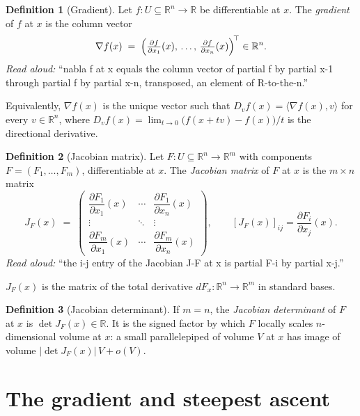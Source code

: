 \documentclass[11pt]{article}
\theoremstyle{definition}
\newtheorem{definition}{Definition}
\begin{document}
\begin{definition}[Gradient]
Let $f : U \subseteq \mathbb{R}^n \to \mathbb{R}$ be differentiable at $x$.
The \emph{gradient} of $f$ at $x$ is the column vector
\[
\nabla f(x) \;=\; \Bigl( \tfrac{\partial f}{\partial x_1}(x),\, \ldots,\,
\tfrac{\partial f}{\partial x_n}(x) \Bigr)^{\!\top} \in \mathbb{R}^n.
\]
\emph{Read aloud:} ``nabla f at x equals the column vector of partial f by partial x-1 through partial f by partial x-n, transposed, an element of R-to-the-n.''

Equivalently, $\nabla f(x)$ is the unique vector such that
$D_v f(x) = \langle \nabla f(x), v\rangle$ for every $v \in \mathbb{R}^n$,
where $D_v f(x) = \lim_{t\to 0}\bigl(f(x + tv) - f(x)\bigr)/t$ is the
directional derivative.
\end{definition}

\begin{definition}[Jacobian matrix]
Let $F : U \subseteq \mathbb{R}^n \to \mathbb{R}^m$ with components
$F = (F_1, \ldots, F_m)$, differentiable at $x$. The \emph{Jacobian
matrix} of $F$ at $x$ is the $m \times n$ matrix
\[
J_F(x) \;=\; \begin{pmatrix}
\dfrac{\partial F_1}{\partial x_1}(x) & \cdots & \dfrac{\partial F_1}{\partial x_n}(x) \\[1ex]
\vdots & \ddots & \vdots \\[1ex]
\dfrac{\partial F_m}{\partial x_1}(x) & \cdots & \dfrac{\partial F_m}{\partial x_n}(x)
\end{pmatrix},
\qquad [J_F(x)]_{ij} = \frac{\partial F_i}{\partial x_j}(x).
\]
\emph{Read aloud:} ``the i-j entry of the Jacobian J-F at x is partial F-i by partial x-j.''

$J_F(x)$ is the matrix of the total derivative
$dF_x : \mathbb{R}^n \to \mathbb{R}^m$ in standard bases.
\end{definition}

\begin{definition}[Jacobian determinant]
If $m = n$, the \emph{Jacobian determinant} of $F$ at $x$ is
$\det J_F(x) \in \mathbb{R}$. It is the signed factor by which $F$
locally scales $n$-dimensional volume at $x$: a small parallelepiped
of volume $V$ at $x$ has image of volume $|\det J_F(x)|\,V + o(V)$.
\end{definition}

\section{The gradient and steepest ascent}
\end{document}

